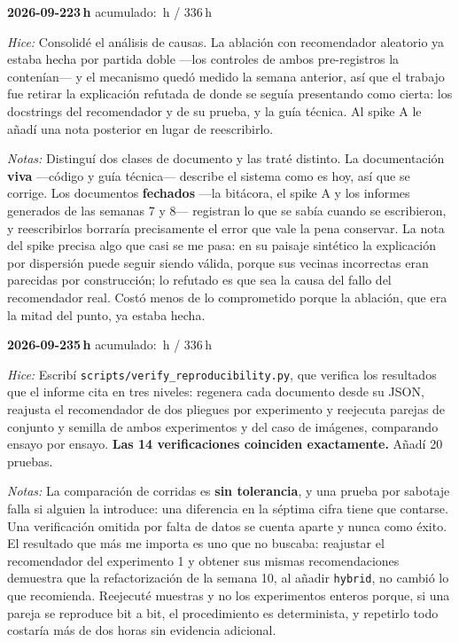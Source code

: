 \documentclass[11pt,letterpaper]{article}
\newcommand{\presupuesto}{336}
\newcommand{\horasacum}{0}
\newcommand{\entrada}[4]{%
  \xdef\horasacum{\fpeval{\horasacum + #2}}%
  \par\medskip
  \noindent\textbf{\color{tecnavy}#1}\quad\textbf{#2\,h}%
  \hfill{\small\color{gris}acumulado: \horasacum\,h / \presupuesto\,h}\par
  \nopagebreak
  \noindent\textit{Hice:} #3\par
  \nopagebreak
  \noindent\textit{Notas:} #4\par
}
\begin{document}
\entrada{2026-09-22}{3}
{Consolidé el análisis de causas. La ablación con recomendador aleatorio ya estaba hecha por
 partida doble ---los controles de ambos pre-registros la contenían--- y el mecanismo quedó
 medido la semana anterior, así que el trabajo fue retirar la explicación refutada de donde
 se seguía presentando como cierta: los docstrings del recomendador y de su prueba, y la guía
 técnica. Al spike A le añadí una nota posterior en lugar de reescribirlo.}
{Distinguí dos clases de documento y las traté distinto. La documentación \textbf{viva}
 ---código y guía técnica--- describe el sistema como es hoy, así que se corrige. Los
 documentos \textbf{fechados} ---la bitácora, el spike A y los informes generados de las
 semanas 7 y 8--- registran lo que se sabía cuando se escribieron, y reescribirlos borraría
 precisamente el error que vale la pena conservar. La nota del spike precisa algo que casi se
 me pasa: en su paisaje sintético la explicación por dispersión puede seguir siendo válida,
 porque sus vecinas incorrectas eran parecidas por construcción; lo refutado es que sea la
 causa del fallo del recomendador real. Costó menos de lo comprometido porque la ablación,
 que era la mitad del punto, ya estaba hecha.}

\entrada{2026-09-23}{5}
{Escribí \texttt{scripts/\allowbreak verify\_\allowbreak reproducibility.py}, que verifica los
 resultados que el informe cita en tres niveles: regenera cada documento desde su JSON,
 reajusta el recomendador de dos pliegues por experimento y reejecuta parejas de conjunto y
 semilla de ambos experimentos y del caso de imágenes, comparando ensayo por ensayo.
 \textbf{Las 14 verificaciones coinciden exactamente.} Añadí 20 pruebas.}
{La comparación de corridas es \textbf{sin tolerancia}, y una prueba por sabotaje falla si
 alguien la introduce: una diferencia en la séptima cifra tiene que contarse. Una
 verificación omitida por falta de datos se cuenta aparte y nunca como éxito. El resultado
 que más me importa es uno que no buscaba: reajustar el recomendador del experimento 1 y
 obtener sus mismas recomendaciones demuestra que la refactorización de la semana 10, al
 añadir \texttt{hybrid}, no cambió lo que recomienda. Reejecuté muestras y no los
 experimentos enteros porque, si una pareja se reproduce bit a bit, el procedimiento es
 determinista, y repetirlo todo costaría más de dos horas sin evidencia adicional.}
\end{document}
